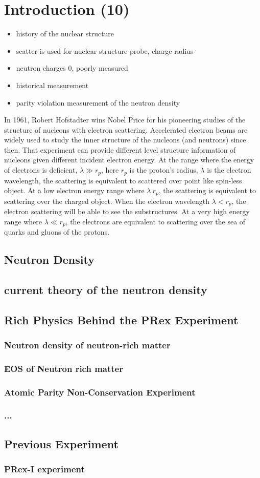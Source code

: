 \chapter{Introduction (10)}

\begin{itemize}
    \item history of the nuclear structure
    \item scatter is used for nuclear structure probe, charge radius 
    \item neutron charges 0, poorly measured
    \item historical measurement 
    \item parity violation measurement of the neutron density
\end{itemize} 

In 1961, Robert Hofstadter wins Nobel Price for his pioneering studies of the structure of nucleons with  electron scattering. Accelerated electron beams are widely used to study the inner structure of the nucleons (and neutrons) since then. That experiment can provide different level structure information of nucleons given different incident electron energy. At the range where the energy of electrons is deficient, $\lambda \gg r_p$, here $r_p$ is the proton's radius, $\lambda$ is the electron wavelength, the scattering is equivalent to scattered over point like spin-less object. At a low electron energy range where $\lambda ~r_p$, the scattering is equivalent to scattering over the charged object. When the electron wavelength $\lambda < r_p$, the electron scattering will be able to see the substructures. At a very high energy range where $\lambda \ll r_p$, the electrons are equivalent to scattering over the sea of quarks and gluons of the protons. 

\section{Neutron Density}
\section{current theory of the neutron density}

\section{Rich Physics Behind the PRex Experiment}
\subsection{Neutron density of neutron-rich matter}
\subsection{EOS of Neutron rich matter}
\subsection{Atomic Parity Non-Conservation Experiment}
\subsection{...}
\section{Previous Experiment}
\subsection{PRex-I experiment}